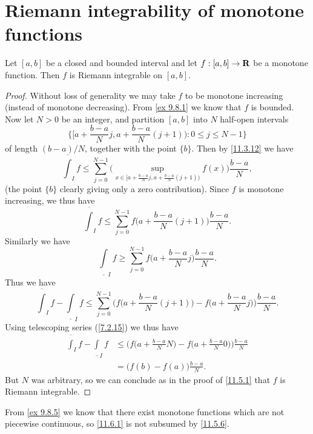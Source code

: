 \section{Riemann integrability of monotone functions}\label{sec 11.6}

\begin{proposition}\label{11.6.1}
  Let \([a, b]\) be a closed and bounded interval and let \(f : [a, b] \to \mathbf{R}\) be a monotone function.
  Then \(f\) is Riemann integrable on \([a, b]\).
\end{proposition}

\begin{proof}
  Without loss of generality we may take \(f\) to be monotone increasing (instead of monotone decreasing).
  From \cref{ex 9.8.1} we know that \(f\) is bounded.
  Now let \(N > 0\) be an integer, and partition \([a, b]\) into \(N\) half-open intervals
  \[
    \bigg\{\big[a + \frac{b - a}{N} j, a + \frac{b - a}{N} (j + 1)\big) : 0 \leq j \leq N - 1\bigg\}
  \]
  of length \((b - a) / N\), together with the point \(\{b\}\).
  Then by \cref{11.3.12} we have
  \[
    \overline{\int}_I f \leq \sum_{j = 0}^{N - 1} \Bigg(\sup_{x \in \big[a + \frac{b - a}{N} j, a + \frac{b - a}{N} (j + 1)\big)} f(x)\Bigg) \frac{b - a}{N},
  \]
  (the point \(\{b\}\) clearly giving only a zero contribution).
  Since \(f\) is monotone increasing, we thus have
  \[
    \overline{\int}_I f \leq \sum_{j = 0}^{N - 1} f\bigg(a + \frac{b - a}{N} (j + 1)\bigg) \frac{b - a}{N}.
  \]
  Similarly we have
  \[
    \underline{\int}_I f \geq \sum_{j = 0}^{N - 1} f\bigg(a + \frac{b - a}{N} j\bigg) \frac{b - a}{N}.
  \]
  Thus we have
  \[
    \overline{\int}_I f - \underline{\int}_I f \leq \sum_{j = 0}^{N - 1} \Bigg(f\bigg(a + \frac{b - a}{N} (j + 1)\bigg) - f\bigg(a + \frac{b - a}{N} j\bigg)\Bigg) \frac{b - a}{N}.
  \]
  Using telescoping series (\cref{7.2.15}) we thus have
  \begin{align*}
    \overline{\int}_I f - \underline{\int}_I f & \leq \Bigg(f\bigg(a + \frac{b - a}{N} N\bigg) - f\bigg(a + \frac{b - a}{N} 0\bigg)\Bigg) \frac{b - a}{N} \\
                                               & = \big(f(b) - f(a)\big) \frac{b - a}{N}.
  \end{align*}
  But \(N\) was arbitrary, so we can conclude as in the proof of \cref{11.5.1} that \(f\) is Riemann integrable.
\end{proof}

\begin{remark}\label{11.6.2}
  From \cref{ex 9.8.5} we know that there exist monotone functions which are not piecewise continuous, so \cref{11.6.1} is not subsumed by \cref{11.5.6}.
\end{remark}

